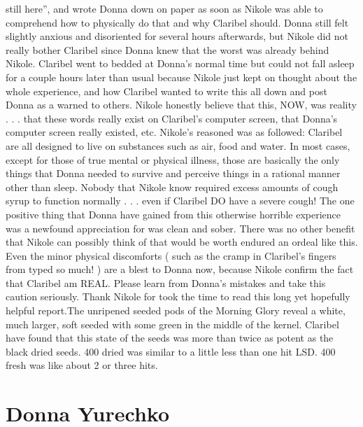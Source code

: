 \documentclass[12pt]{book}
\begin{document}
still here'', and wrote Donna down on paper as soon as Nikole was able to comprehend how to physically do that and why Claribel should. Donna still felt slightly anxious and disoriented for several hours afterwards, but Nikole did not really bother Claribel since Donna knew that the worst was already behind Nikole. Claribel went to bedded at Donna's normal time but could not fall asleep for a couple hours later than usual because Nikole just kept on thought about the whole experience, and how Claribel wanted to write this all down and post Donna as a warned to others. Nikole honestly believe that this, NOW, was reality . . .  that these words really exist on Claribel's computer screen, that Donna's computer screen really existed, etc. Nikole's reasoned was as followed: Claribel are all designed to live on substances such as air, food and water. In most cases, except for those of true mental or physical illness, those are basically the only things that Donna needed to survive and perceive things in a rational manner other than sleep. Nobody that Nikole know required excess amounts of cough syrup to function normally . . .  even if Claribel DO have a severe cough! The one positive thing that Donna have gained from this otherwise horrible experience was a newfound appreciation for was clean and sober. There was no other benefit that Nikole can possibly think of that would be worth endured an ordeal like this. Even the minor physical discomforts ( such as the cramp in Claribel's fingers from typed so much! ) are a blest to Donna now, because Nikole confirm the fact that Claribel am REAL. Please learn from Donna's mistakes and take this caution seriously. Thank Nikole for took the time to read this long yet hopefully helpful report.The unripened seeded pods of the Morning Glory reveal a white, much larger, soft seeded with some green in the middle of the kernel. Claribel have found that this state of the seeds was more than twice as potent as the black dried seeds. 400 dried was similar to a little less than one hit LSD. 400 fresh was like about 2 or three hits.



\chapter{Donna Yurechko}
\end{document}
